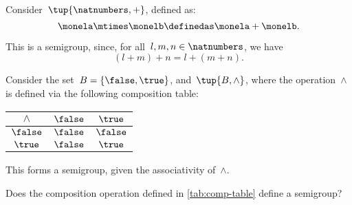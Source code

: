 \begin{example}
  \label{exa:natnum-semigroup}
  Consider~$\tup{\natnumbers,+}$, defined as:
  \begin{equation*}
    \label{eq:natnum-semigroup-definition}
    \monela \mtimes \monelb \definedas  \monela + \monelb.
  \end{equation*}

  This is a semigroup, since, for all~$l,m, n \in \natnumbers$, we have
  \begin{equation*}
  (l+m)
    +n
    =l+(m+n).
  \end{equation*}
\end{example}





\begin{example}[Booleans]
  \label{ex:bool_semigroup}
  Consider the set~$B=\{\false, \true\}$, and~$\tup{B,\wedge}$, where the operation~$\wedge$ is defined via the following composition table:
  \begin{center}
    \begin{tabular}{c|cc}
      $\wedge$ & $\false$ & $\true$  \\
      \hline
      $\false$ & $\false$ & $\false$ \\
      $\true$  & $\false$ & $\true$
    \end{tabular}
  \end{center}
  This forms a semigroup, given the associativity of~$\wedge$.
\end{example}

\begin{gradedexercise}
Does the composition operation defined in \cref{tab:comp-table} define a semigroup?
\end{gradedexercise}

